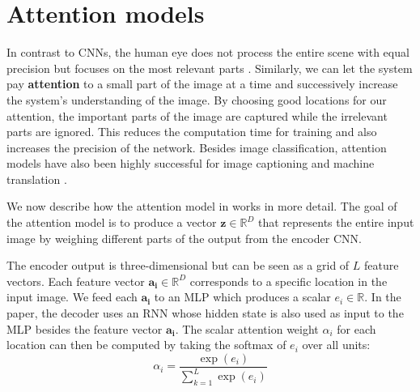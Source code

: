 \section{Attention models}
\label{ssec:attention}


In contrast to CNNs, the human eye does not process the entire scene with equal precision but focuses on the most relevant parts \cite{DeepMindAttention}.
Similarly, we can let the system pay \textbf{attention} to a small part of the image at a time and successively increase the system's understanding of the image.
By choosing good locations for our attention, the important parts of the image are captured while the irrelevant parts are ignored.
This reduces the computation time for training and also increases the precision of the network.
Besides image classification, attention models have also been highly successful for image captioning \cite{AttendAndTell} and machine translation \cite{machine_translation_attention}.

We now describe how the attention model in \cite{AttendAndTell} works in more detail.
The goal of the attention model is to produce a vector $\mathbf{z} \in \mathbb{R}^D$ that represents the entire input image by weighing different parts of the output from the encoder CNN.

The encoder output is three-dimensional but can be seen as a grid of $L$ feature vectors. Each feature vector $\mathbf{a_i} \in \mathbb{R}^D$ corresponds to a specific location in the input image. We feed each $\mathbf{a_i}$ to an MLP which produces a scalar $e_i \in \mathbb{R}$. In the paper, the decoder uses an RNN whose hidden state is also used as input to the MLP besides the feature vector $\mathbf{a_i}$.
The scalar attention weight $\alpha_i$ for each location can then be computed by taking the softmax of $e_i$ over all units:
\[
\alpha_i = \frac{ \exp(e_i) }{ \sum_{k=1}^L \exp(e_i) }
\]

